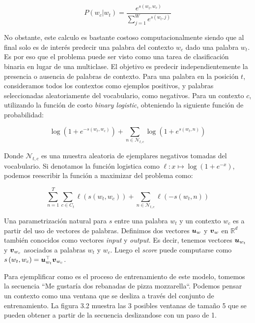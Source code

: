 \begin{equation} \label{eq:skipram-softmax}
    P(w_{c}|w_{t}) = \frac{e^{s(w_t, w_c)}}{\sum_{j=1}^{W} e^{s(w_t, j)}}
\end{equation}

No obstante, este calculo es bastante costoso computacionalmente siendo que al
final solo es de interés predecir una palabra del contexto $w_c$ dado una
palabra $w_t$. Es por eso que el problema puede ser visto como una tarea de
clasificación binaria en lugar de una multiclase. El objetivo es predecir
independientemente la presencia o ausencia de palabras de contexto. Para una
palabra en la posición $t$, consideramos todos los contextos como ejemplos
positivos, y palabras seleccionadas aleatoriamente del vocabulario, como
negativos. Para un contexto $c$, utilizando la función de costo \emph{binary
logistic}, obteniendo la siguiente función de probabilidad:

\begin{equation}
    \log\left( 1 + e^{-s(w_t, w_c)} \right) +
    \sum_{n \in \mathcal{N}_{t, c}} \log\left( 1 + e^{s(w_t, n)} \right)
\end{equation}

Donde $\mathcal{N}_{t, c}$ es una muestra aleatoria de ejemplares negativos
tomadas del vocabulario. Si denotamos la función logistica como $\ell: x \mapsto
\log \left(1 + e^{-x} \right)$, podemos reescribir la función a maximizar del
problema como:

\begin{equation}
    \sum_{n=1}^{T} 
        \sum_{c \in C_t} \ell\left(s(w_t, w_c)\right) +
        \sum_{n \in \mathcal{N}_{t, c}} \ell\left(-s(w_t, n) \right)
\end{equation}

Una parametrización natural para $s$ entre una palabra $w_t$ y un contexto $w_c$
es a partir del uso de vectores de palabras. Definimos dos vectores $\boldsymbol{u}_w$
y $\boldsymbol{v}_w$ en $\mathbb{R}^d$ también conocidos como vectores \emph{input} y
\emph{output}. Es decir, tenemos vectores $\boldsymbol{u}_{w_t}$ y $\boldsymbol{v}_{w_c}$
asociados a palabras $w_t$ y $w_c$. Luego el \emph{score} puede computarse como
$s\left( w_t, w_c \right) = \boldsymbol{u}_{w_t}^\top \boldsymbol{v}_{w_c}$.

Para ejemplificar como es el proceso de entrenamiento de este modelo, tomemos la
secuencia ``Me gustaría dos rebanadas de pizza mozzarella``. Podemos pensar un
contexto como una ventana que se desliza a través del conjunto de entrenamiento.
La figura 3.2 muestra las 3 posibles ventanas de tamaño 5 que se pueden obtener
a partir de la secuencia deslizandose con un paso de 1.

